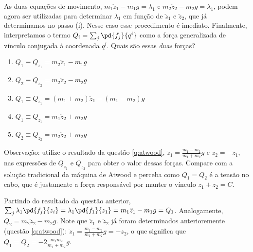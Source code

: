 \begin{question}
  	As duas equações de movimento, $m_1\ddot z_1 - m_1 g = \lambda_1$ e $m_2\ddot z_2 - m_2 g = \lambda_1$, podem agora ser utilizadas para determinar $\lambda_1$ em função de $\ddot z_1$ e $\ddot z_2$, que já determinamos no passo (i).
  	Nesse caso esse procedimento é imediato.
  	Finalmente, interpretamos o termo $Q_i = \sum_j \pd{f_j}{q^i}$ como a força generalizada de vínculo conjugada à coordenada $q^i$.
  	Quais são essas \emph{duas} forças?

  	\begin{enumerate}
  		\item $Q_1 \equiv Q_{z_1} = m_2\ddot z_1 - m_1 g$ \rightanswer
  		\item $Q_2 \equiv Q_{z_2} = m_2\ddot z_2 - m_2 g$ \rightanswer
  		\item $Q_1 \equiv Q_{z_1} = (m_1 + m_2) \ddot z_1 - (m_1 - m_2)g$
  		\item $Q_1 \equiv Q_{z_1} = m_1\ddot z_2 + m_2 g$
  		\item $Q_2 \equiv Q_{z_2} = m_2\ddot z_2 + m_2 g$
  	\end{enumerate}

  	\bigskip
  	\begin{compactdesc}
  		\item[Observação:] utilize o resultado da questão \ref{q:atwood}, $\ddot z_1 = \frac{m_1 - m_2}{m_1 + m_2}g$ e $\ddot z_2 = - \ddot z_1$, nas expressões de $Q_{z_1}$ e $Q_{z_2}$ para obter o valor dessas forças.
  		Compare com a solução tradicional da máquina de Atwood e perceba como $Q_1 = Q_2$ é a tensão no cabo, que é justamente a força responsável por manter o vínculo $z_1 + z_2 = C$.
  	\end{compactdesc}

    \begin{solution}
      Partindo do resultado da questão anterior, $\sum_{j} \lambda_1 \pd{f_j}{z_i} = \lambda_1 \pd{f_1}{z_1} = m_1\ddot z_1 - m_1g = Q_1$.
      Analogamente, $Q_2 = m_2\ddot z_2 - m_2g$.
      Note que $\ddot z_1$ e $\ddot z_2$ já foram determinados anterioremente (questão \ref{q:atwood}): $\ddot z_1 = \frac{m_1 - m_2}{m_1 + m_2}g = -z_2$, o que significa que $Q_1 = Q_2 = -2\frac{m_1m_2}{m_1 + m_2}g$.
    \end{solution}
\end{question}